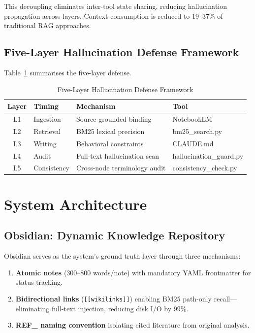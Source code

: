 \documentclass[conference]{IEEEtran}
\begin{document}
This decoupling eliminates inter-tool state sharing, reducing hallucination
propagation across layers. Context consumption is reduced to 19--37\% of
traditional RAG approaches.

\subsection{Five-Layer Hallucination Defense Framework}

Table~\ref{tab:defense} summarises the five-layer defense.

\begin{table}[ht]
\caption{Five-Layer Hallucination Defense Framework}
\label{tab:defense}
\centering
\begin{tabular}{clll}
\toprule
\textbf{Layer} & \textbf{Timing} & \textbf{Mechanism} & \textbf{Tool} \\
\midrule
L1 & Ingestion    & Source-grounded binding     & NotebookLM \\
L2 & Retrieval    & BM25 lexical precision      & bm25\_search.py \\
L3 & Writing      & Behavioral constraints      & CLAUDE.md \\
L4 & Audit        & Full-text hallucination scan & hallucination\_guard.py \\
L5 & Consistency  & Cross-node terminology audit & consistency\_check.py \\
\bottomrule
\end{tabular}
\end{table}

\section{System Architecture}

\subsection{Obsidian: Dynamic Knowledge Repository}

Obsidian serves as the system's ground truth layer through three mechanisms:

\begin{enumerate}
  \item \textbf{Atomic notes} (300--800 words/note) with mandatory YAML
        frontmatter for status tracking.
  \item \textbf{Bidirectional links} (\texttt{[[wikilinks]]}) enabling
        BM25 path-only recall---eliminating full-text injection, reducing
        disk I/O by 99\%.
  \item \textbf{REF\_ naming convention} isolating cited literature from
        original analysis.
\end{enumerate}
\end{document}
